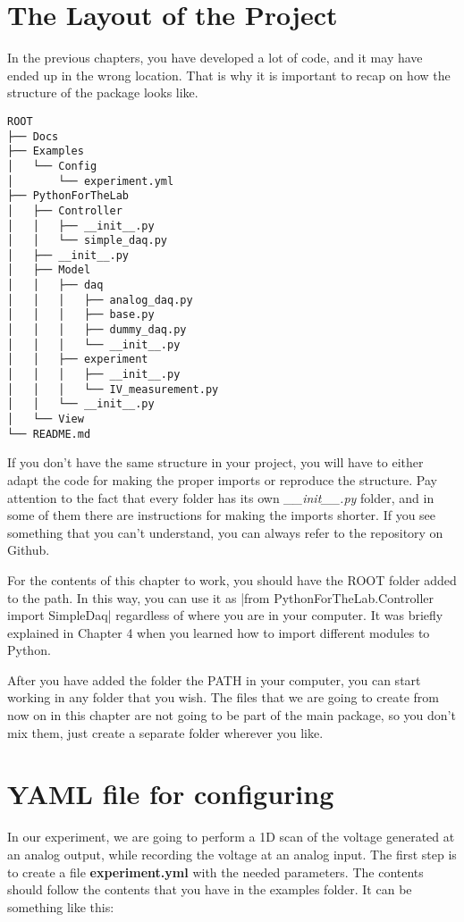 \section{The Layout of the Project}\label{the-layout-of-theproject}
In the previous chapters, you have developed a lot of code, and it may
have ended up in the wrong location. That is why it is important to
recap on how the structure of the package looks like.

\begin{verbatim}
ROOT
├── Docs
├── Examples
│   └── Config
│       └── experiment.yml
├── PythonForTheLab
│   ├── Controller
│   │   ├── __init__.py
│   │   └── simple_daq.py
│   ├── __init__.py
│   ├── Model
│   │   ├── daq
│   │   │   ├── analog_daq.py
│   │   │   ├── base.py
│   │   │   ├── dummy_daq.py
│   │   │   └── __init__.py
│   │   ├── experiment
│   │   │   ├── __init__.py
│   │   │   └── IV_measurement.py
│   │   └── __init__.py
│   └── View
└── README.md
\end{verbatim}

If you don't have the same structure in your project, you will have to
either adapt the code for making the proper imports or reproduce the
structure. Pay attention to the fact that every folder has its own
\emph{\_\_init\_\_.py} folder, and in some of them there are
instructions for making the imports shorter. If you see something that
you can't understand, you can always refer to the repository on Github.

For the contents of this chapter to work, you should have the {ROOT}
folder added to the path. In this way, you can use it as
|from PythonForTheLab.Controller import SimpleDaq| 
regardless of where you are in your computer. It was briefly explained in Chapter 4
when you learned how to import different modules to Python.

After you have added the folder the {PATH} in your computer, you can
start working in any folder that you wish. The files that we are going
to create from now on in this chapter are not going to be part of the
main package, so you don't mix them, just create a separate folder
wherever you like.

\section{{YAML} file for configuring}\label{yaml-file-forconfiguring}
In our experiment, we are going to perform a 1D scan of the voltage
generated at an analog output, while recording the voltage at an analog
input. The first step is to create a file \textbf{experiment.yml} with
the needed parameters. The contents should follow the contents that you
have in the examples folder. It can be something like this:

